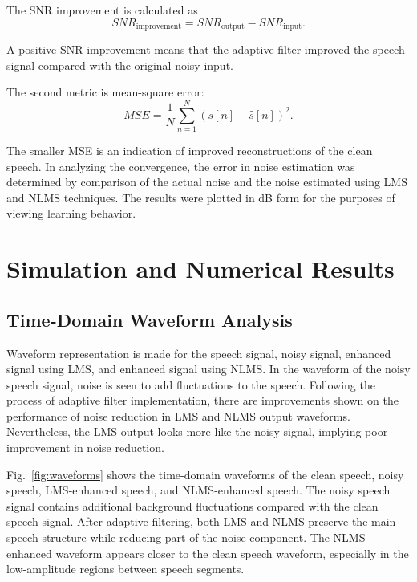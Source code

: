 \documentclass[12pt]{article}
\begin{document}
The SNR improvement is calculated as
\begin{equation}
SNR_{\text{improvement}} = SNR_{\text{output}} - SNR_{\text{input}}.
\end{equation}

A positive SNR improvement means that the adaptive filter improved the speech signal compared with the original noisy input.

The second metric is mean-square error:
\begin{equation}
MSE = \frac{1}{N}\sum_{n=1}^{N}(s[n]-\hat{s}[n])^2.
\end{equation}

The smaller MSE is an indication of improved reconstructions of the clean speech. In analyzing the convergence, the error in noise estimation was determined by comparison of the actual noise and the noise estimated using LMS and NLMS techniques. The results were plotted in dB form for the purposes of viewing learning behavior.

\section{Simulation and Numerical Results}

\subsection{Time-Domain Waveform Analysis}

Waveform representation is made for the speech signal, noisy signal, enhanced signal using LMS, and enhanced signal using NLMS. In the waveform of the noisy speech signal, noise is seen to add fluctuations to the speech. Following the process of adaptive filter implementation, there are improvements shown on the performance of noise reduction in LMS and NLMS output waveforms. Nevertheless, the LMS output looks more like the noisy signal, implying poor improvement in noise reduction. 


Fig.~\ref{fig:waveforms} shows the time-domain waveforms of the clean speech, noisy speech, LMS-enhanced speech, and NLMS-enhanced speech. The noisy speech signal contains additional background fluctuations compared with the clean speech signal. After adaptive filtering, both LMS and NLMS preserve the main speech structure while reducing part of the noise component. The NLMS-enhanced waveform appears closer to the clean speech waveform, especially in the low-amplitude regions between speech segments.
\end{document}
